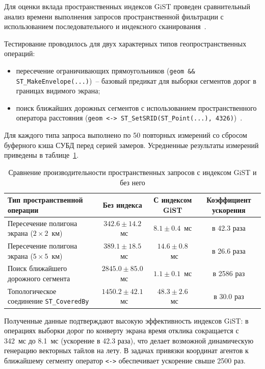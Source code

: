 Для оценки вклада пространственных индексов GiST проведен сравнительный анализ времени выполнения запросов пространственной фильтрации с использованием последовательного и индексного сканирования~\cite{nextgis2024indexes, gistda2017comparison}.

Тестирование проводилось для двух характерных типов геопространственных операций:
\begin{itemize}
    \item пересечение ограничивающих прямоугольников (\texttt{geom \&\& ST\_MakeEnvelope(...)})~-- базовый предикат для выборки сегментов дорог в границах видимого экрана;
    \item поиск ближайших дорожных сегментов с использованием пространственного оператора расстояния (\texttt{geom <-> ST\_SetSRID(ST\_Point(...), 4326)})~\cite{vonng2018knn}.
\end{itemize}

Для каждого типа запроса выполнено по 50 повторных измерений со сбросом буферного кэша СУБД перед серией замеров. Усредненные результаты измерений приведены в таблице~\ref{tab:gist_perf}.

\begin{table}[htbp]
\small
\centering
\caption{Сравнение производительности пространственных запросов с индексом GiST и без него}
\label{tab:gist_perf}
\begin{tabularx}{\linewidth}{|X|c|c|c|}
\hline
\textbf{Тип пространственной операции} & \textbf{Без индекса} & \textbf{С индексом GiST} & \textbf{Коэффициент ускорения} \\ \hline
Пересечение полигона экрана ($2 \times 2$~км) & $342.6 \pm 14.2$~мс & $8.1 \pm 0.4$~мс & в 42.3 раза \\ \hline
Пересечение полигона экрана ($5 \times 5$~км) & $389.1 \pm 18.5$~мс & $14.6 \pm 0.8$~мс & в 26.6 раза \\ \hline
Поиск ближайшего дорожного сегмента & $2845.0 \pm 85.0$~мс & $1.1 \pm 0.1$~мс & в 2586 раз \\ \hline
Топологическое соединение \texttt{ST\_CoveredBy} & $1450.2 \pm 42.1$~мс & $48.3 \pm 2.6$~мс & в 30.0 раз \\ \hline
\end{tabularx}
\end{table}

Полученные данные подтверждают высокую эффективность индексов GiST: в операциях выборки дорог по конверту экрана время отклика сокращается с 342~мс до 8.1~мс (ускорение в 42.3 раза), что делает возможной динамическую генерацию векторных тайлов на лету. В задачах привязки координат агентов к ближайшему сегменту оператор \texttt{<->} обеспечивает ускорение свыше 2500 раз.

